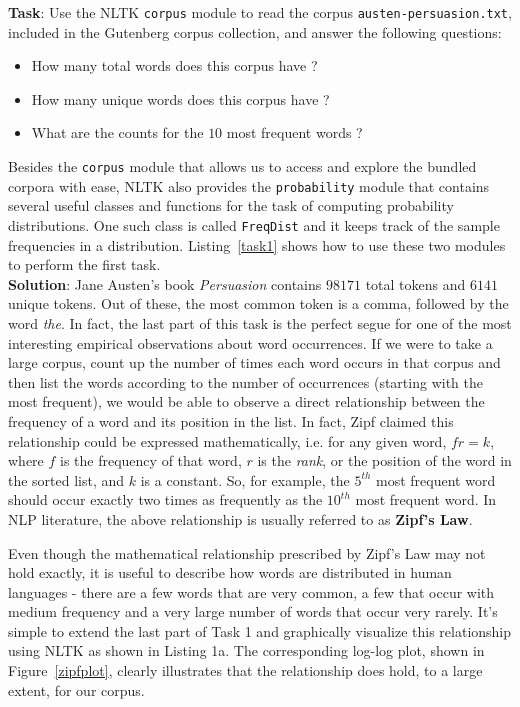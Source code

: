 \documentclass[11pt]{article}
\begin{document}
\noindent \textbf{Task}: Use the NLTK \texttt{corpus} module to read the corpus \texttt{austen-persuasion.txt}, included in the Gutenberg corpus collection, and answer the following questions:
\begin{itemize}
	 \item How many total words does this corpus have ?
	 \item How many unique words does this corpus have ?
	 \item What are the counts for the $10$ most frequent words ?
\end{itemize}

\noindent Besides the \texttt{corpus} module that allows us to access and explore the bundled corpora with ease, NLTK also provides the \texttt{probability} module that contains several useful classes and functions for the task of computing probability distributions. One such  class is called \texttt{FreqDist} and it keeps track of the sample frequencies in a distribution. Listing~\ref{task1} shows how to use these two modules to perform the first task. \\

\noindent \textbf{Solution}: Jane Austen's book \emph{Persuasion} contains $98171$ total tokens and $6141$ unique tokens. Out of these, the most common token is a comma, followed by the word \emph{the}. In fact, the last part of this task is the perfect segue for one of the most interesting empirical observations about word occurrences. If we were to take a large corpus, count up the number of times each word occurs in that corpus and then list the words according to the number of occurrences (starting with the most frequent), we would be able to observe a direct relationship between the frequency of a word and its position in the list. In fact, Zipf claimed this relationship could be expressed mathematically, i.e. for any given word, $fr = k$, where $f$ is the frequency of that word, $r$ is the \emph{rank}, or the position of the word in the sorted list, and $k$ is a constant. So, for example, the $5^{th}$ most frequent word should occur exactly two times as frequently as the $10^{th}$ most frequent word. In NLP literature, the above relationship is usually referred to as \textbf{Zipf's Law}.

Even though the mathematical relationship prescribed by Zipf's Law may not hold exactly, it is useful to describe how words are distributed in human languages - there are a few words that are very common, a few that occur with medium frequency and a very large number of words that occur very rarely. It's simple to extend the last part of Task 1 and graphically visualize this relationship using NLTK as shown in Listing 1a. The corresponding log-log plot, shown in Figure~\ref{zipfplot}, clearly illustrates that the relationship does hold, to a large extent, for our corpus.
\end{document}
